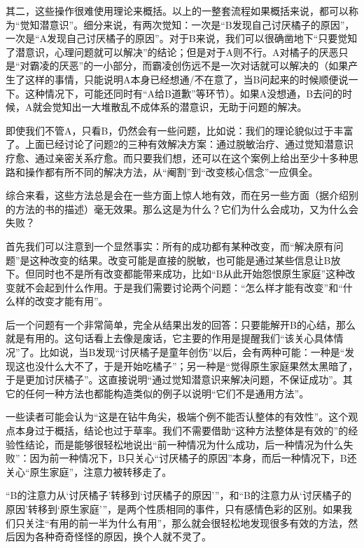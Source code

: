 其二，这些操作很难使用理论来概括。以上的一整套流程如果概括来说，都可以称为“觉知潜意识”。细分来说，有两次觉知：一次是“B发现自己讨厌橘子的原因”，一次是“A发现自己讨厌橘子的原因”。对于B来说，我们可以很确凿地下“只要觉知了潜意识，心理问题就可以解决”的结论；但是对于A则不行。A对橘子的厌恶只是“对霸凌的厌恶”的一小部分，而霸凌创伤远不是一次对话就可以解决的（如果产生了这样的事情，只能说明A本身已经想通/不在意了，当B问起来的时候顺便说一下。这种情况下，可能还同时有“A给B道歉”等环节）。如果A没想通，B去问的时候，A就会觉知出一大堆散乱不成体系的潜意识，无助于问题的解决。

即使我们不管A，只看B，仍然会有一些问题，比如说：我们的理论貌似过于丰富了。上面已经讨论了问题2的三种有效解决方案：通过脱敏治疗、通过觉知潜意识疗愈、通过亲密关系疗愈。而只要我们想，还可以在这个案例上给出至少十多种思路和操作都有所不同的解决方法，从“阉割”到“改变核心信念”一应俱全。

综合来看，这些方法总是会在一些方面上惊人地有效，而在另一些方面（据介绍别的方法的书的描述）毫无效果。那么这是为什么？它们为什么会成功，又为什么会失败？

\divider

首先我们可以注意到一个显然事实：所有的成功都有某种改变，而“解决原有问题”是这种改变的结果。改变可能是直接的脱敏，也可能是通过某些信息让B放下。但同时也不是所有改变都能带来成功，比如“B从此开始怨恨原生家庭”这种改变就不会起到什么作用。于是我们需要讨论两个问题：“怎么样才能有改变”和“什么样的改变才能有用”。

后一个问题有一个非常简单，完全从结果出发的回答：只要能解开B的心结，那么就是有用的。这句话看上去像是废话，它主要的作用是提醒我们“该关心具体情况”了。比如说，当B发现“讨厌橘子是童年创伤”以后，会有两种可能：一种是“发现这也没什么大不了，于是开始吃橘子”；另一种是“觉得原生家庭果然太黑暗了，于是更加讨厌橘子”。这直接说明“通过觉知潜意识来解决问题，不保证成功”。其它的任何一种方法也都能构造类似的例子以说明“它们不是通用方法”。

一些读者可能会认为“这是在钻牛角尖，极端个例不能否认整体的有效性”。这个观点本身过于概括，结论也过于草率。我们不需要借助“这种方法整体是有效的”的经验性结论，而是能够很轻松地说出“前一种情况为什么成功，后一种情况为什么失败”：因为前一种情况下，B只关心“讨厌橘子的原因”本身，而后一种情况下，B还关心“原生家庭”，注意力被转移走了。

“B的注意力从‘讨厌橘子’转移到‘讨厌橘子的原因’”，和“B的注意力从‘讨厌橘子的原因’转移到‘原生家庭’”，是两个性质相同的事件，只有感情色彩的区别。如果我们只关注“有用的前一半为什么有用”，那么就会很轻松地发现很多有效的方法，然后因为各种奇奇怪怪的原因，换个人就不灵了。

